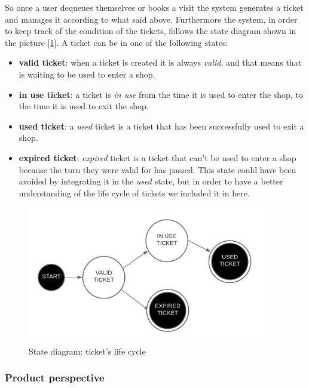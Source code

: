 So once a user dequeues themselves or books a visit the system generates a ticket and manages it according to what said above. Furthermore the system, in order to keep track of the condition of the tickets, follows the state diagram shown in the picture [\ref{fig:ticketlifecycle}]. A ticket can be in one of the following states:
\begin{itemize}[topsep=0pt]
    \item \textbf{valid ticket}: when a ticket is created it is always \textit{valid}, and that means that is waiting to be used to enter a shop.
    \item \textbf{in use ticket}: a ticket is \textit{in use} from the time it is used to enter the shop, to the time it is used to exit the shop.
    \item \textbf{used ticket}: a \textit{used} ticket is a ticket that has been successfully used to exit a shop. 
    \item \textbf{expired ticket}: \textit{expired} ticket is a ticket that can't be used to enter a shop because the turn they were valid for has passed. This state could have been avoided by integrating it in the \textit{used} state, but in order to have a better understanding of the life cycle of tickets we included it in here. 
\end{itemize}

\begin{figure}[h!]
    \centering
    \includegraphics[height=6cm]{Images/statediagrams/ticketlifecycle.png}
    \caption{\label{fig:ticketlifecycle}State diagram: ticket's life cycle}
\end{figure}

\FloatBarrier

\subsubsection{Product perspective}
\label{subsubsect:productperspective}

